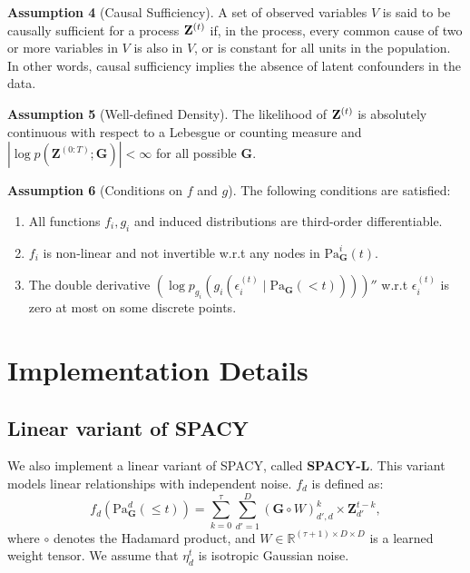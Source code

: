 {\textbf{Assumption 4} (Causal Sufficiency). A set of observed variables $V$ is said to be causally sufficient for a process $\mathbf{Z}^{(t)}$ if, in the process, every common cause of two or more variables in $V$ is also in $V$, or is constant for all units in the population. In other words, causal sufficiency implies the absence of latent confounders in the data.

\textbf{Assumption 5} (Well-defined Density). The likelihood of $\mathbf{Z}^{(t)}$ is absolutely continuous
with respect to a Lebesgue or counting measure and $\left| \log p\left( \mathbf{Z}^{(0:T)}; \mathbf{G} \right)\right| < \infty$ for all possible $\mathbf{G}$.

\textbf{Assumption 6} (Conditions on $f$ and $g$). The following conditions are satisfied: 
\begin{enumerate}
    \item All functions $f_i, g_i$ and induced distributions are third-order differentiable.
    \item $f_i$ is non-linear and not invertible w.r.t any nodes in $\text{Pa}_\mathbf{G}^i(t)$.
    \item The double derivative $\displaystyle \left( \log p_{g_i} \left( g_i \left( \epsilon_i^{(t)} \mid \text{Pa}_\mathbf{G}(<t) \right)\right) \right)''$ w.r.t $\epsilon_i^{(t)}$ is zero at most on some discrete points.
\end{enumerate}
}


\section{Implementation Details}
\label{app:implementation_details}

\subsection{Linear variant of SPACY}
 We also implement a linear variant of SPACY, called \textbf{SPACY-L}. This variant models linear relationships with independent noise. $f_d$ is defined as:
\begin{equation}
f_d\left(\text{Pa}^d_\mathbf{G}(\leq t)\right) = \sum_{k = 0}^{\tau} \sum_{d'=1}^{D} (\mathbf{G} \circ W)^{k}_{d',d} \times \mathbf{Z}^{t-k}_{d'}, \label{eqn:f_def}
\end{equation}
where \( \circ \) denotes the Hadamard product, and \( W \in \mathbb{R}^{(\tau+1) \times D \times D} \) is a learned weight tensor. We assume that $\eta^t_d$ is isotropic Gaussian noise.

